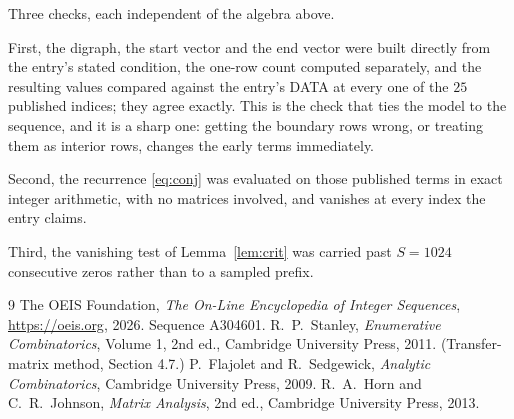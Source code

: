 \documentclass[11pt,a4paper]{article}
\theoremstyle{plain}
\theoremstyle{definition}
\begin{document}
Three checks, each independent of the algebra above.

First, the digraph, the start vector and the end vector were built directly from the
entry's stated condition, the one-row count computed separately, and the resulting values
compared against the entry's DATA at every one of the $25$ published indices; they
agree exactly. This is the check that ties the model to the sequence, and it is a sharp one:
getting the boundary rows wrong, or treating them as interior rows, changes the early terms
immediately.

Second, the recurrence \eqref{eq:conj} was evaluated on those published terms in exact
integer arithmetic, with no matrices involved, and vanishes at every index the entry claims.

Third, the vanishing test of Lemma~\ref{lem:crit} was carried past $S=1024$ consecutive
zeros rather than to a sampled prefix.

\begin{thebibliography}{9}
 The OEIS Foundation, \emph{The On-Line Encyclopedia of Integer
Sequences}, \url{https://oeis.org}, 2026. Sequence A304601.
 R.~P.~Stanley, \emph{Enumerative Combinatorics}, Volume 1, 2nd ed.,
Cambridge University Press, 2011. (Transfer-matrix method, Section 4.7.)
 P.~Flajolet and R.~Sedgewick, \emph{Analytic Combinatorics}, Cambridge
University Press, 2009.
 R.~A.~Horn and C.~R.~Johnson, \emph{Matrix Analysis}, 2nd ed., Cambridge
University Press, 2013.
\end{thebibliography}
\end{document}
